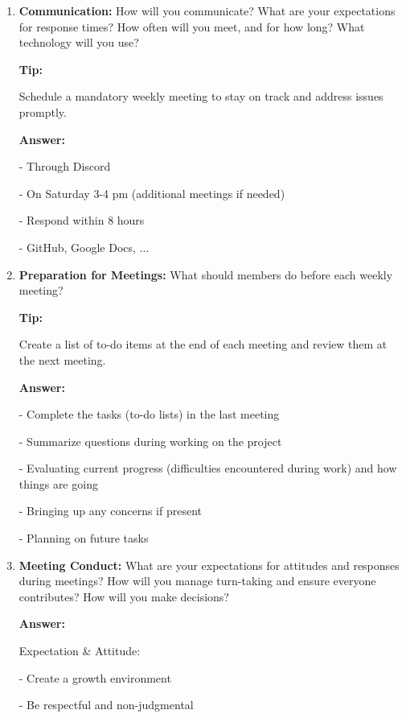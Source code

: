 \documentclass[12pt]{article}
\newenvironment{answer}[1][]{
  \color{blue}\textbf{Answer:}
}{}
\newenvironment{alice}[1][]{
  \color{black}\textbf{Tip:}
}{}
\begin{document}
\begin{enumerate}
\item {\bf Communication:} How will you communicate? What are your expectations for response times? How often will you meet, and for how long? What technology will you use?

\begin{alice}

Schedule a mandatory weekly meeting to stay on track and address issues promptly.
\end{alice}

\begin{answer}

- Through Discord

- On Saturday 3-4 pm (additional meetings if needed)

- Respond within 8 hours

- GitHub, Google Docs, ...
\end{answer}

\item {\bf Preparation for Meetings:} What should members do before each weekly meeting?

\begin{alice}

Create a list of to-do items at the end of each meeting and review them at the next meeting.

\end{alice}

\begin{answer}

- Complete the tasks (to-do lists) in the last meeting

- Summarize questions during working on the project

- Evaluating current progress (difficulties encountered during work) and how things are going

- Bringing up any concerns if present

- Planning on future tasks
\end{answer}


\item {\bf Meeting Conduct:} What are your expectations for attitudes and responses during meetings? How will you manage turn-taking and ensure everyone contributes? How will you make decisions?

\begin{answer}

Expectation \& Attitude:

- Create a growth environment

- Be respectful and non-judgmental


\end{answer}
\end{enumerate}
\end{document}
